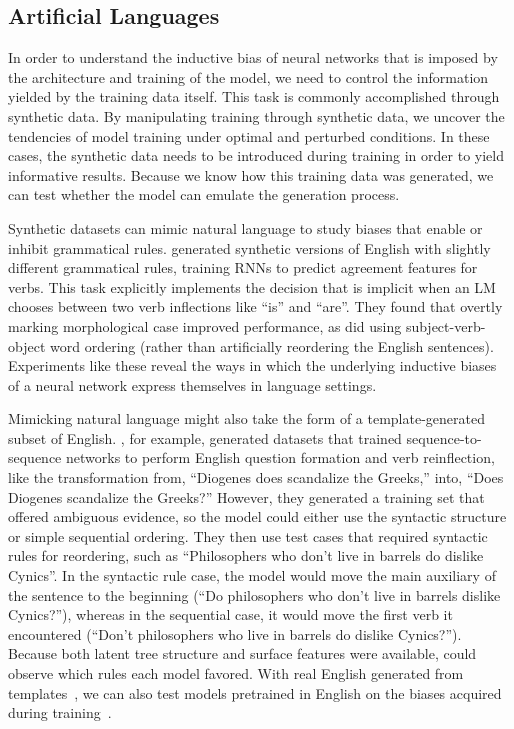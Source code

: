\subsection{Artificial Languages}

In order to understand the inductive bias of neural networks that is imposed by the architecture and training of the model, we need to control the information yielded by the training data itself.
 This task is commonly accomplished through synthetic data. By manipulating training through synthetic data, we uncover the tendencies of model training under optimal and perturbed conditions. In these cases, the synthetic data needs to be introduced during training in order to yield informative results. Because we know how this training data was generated, we can test whether the model can emulate the generation process.
 
Synthetic datasets can mimic natural language to study biases that enable or inhibit grammatical rules.  \citet{ravfogel_studying_2019} generated synthetic versions of English with slightly different grammatical rules, training RNNs to predict agreement features for verbs. This task explicitly implements the decision that is implicit when an LM chooses between two verb inflections like ``is'' and ``are''. They found that overtly marking morphological case improved performance, as did using subject-verb-object word ordering (rather than artificially reordering the English sentences). Experiments like these reveal the ways in which the underlying inductive biases of a neural network express themselves in language settings.

Mimicking natural language might also take the form of a template-generated subset of English. \citet{mccoy_does_2020}, for example, generated datasets that trained sequence-to-sequence networks to perform English question formation and verb reinflection, like the transformation from, ``Diogenes does scandalize the Greeks,'' into, ``Does Diogenes scandalize the Greeks?'' However, they generated a training set that offered ambiguous evidence, so the model could either use the syntactic structure or simple sequential ordering. They then use test cases that required syntactic rules for reordering, such as ``Philosophers who don't live in barrels do dislike Cynics''. In the syntactic rule case, the model would move the main auxiliary of the sentence to the beginning (``Do philosophers who don't live in barrels dislike Cynics?''), whereas in the sequential case, it would move the first verb it encountered (``Don't philosophers who live in barrels do dislike Cynics?''). Because both latent tree structure and surface features were available, \citet{mccoy_does_2020} could observe which rules each model favored. With real English generated from templates~\citep{ravfogel_studying_2019}, we can also test models pretrained in English on the biases acquired during training~\citep{warstadt_learning_2020}. 
 
